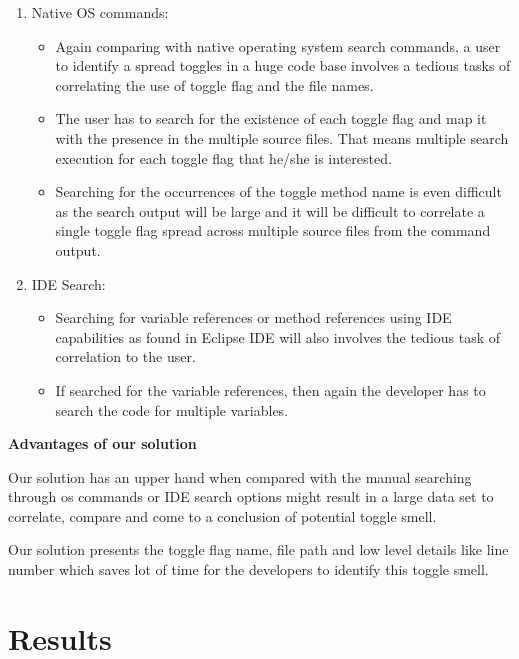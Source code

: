 \documentclass[conference]{IEEEtran}
\begin{document}
\begin{enumerate}
\item{Native OS commands:

\begin{itemize}
\item Again comparing with native operating system search commands, a user to identify a spread toggles in a huge code base involves a tedious tasks of correlating the use of toggle flag and the file names.
\item The user has to search for the existence of each toggle flag and map it with the presence in the multiple source files. That means multiple search execution for each toggle flag that he/she is interested.
\item Searching for the occurrences of the toggle method name is even difficult as the search output will be large and it will be difficult to correlate a single toggle flag spread across multiple source files from the command output.
\end{itemize}
}

\item{IDE Search:
\begin{itemize}
\item Searching for variable references or method references using IDE capabilities as found in Eclipse IDE will also involves the tedious task of correlation to the user.
\item If searched for the variable references, then again the developer has to search the code for multiple variables.
\end{itemize}
}
\end{enumerate}

\textbf{Advantages of our solution}

Our solution has an upper hand when compared with the manual searching through os commands or IDE search options might result in a large data set to correlate, compare and come to a conclusion of potential toggle smell.

Our solution presents the toggle flag name, file path and low level details like line number which saves lot of time for the developers to identify this toggle smell.

\section{Results}
\label{threats}
\end{document}
